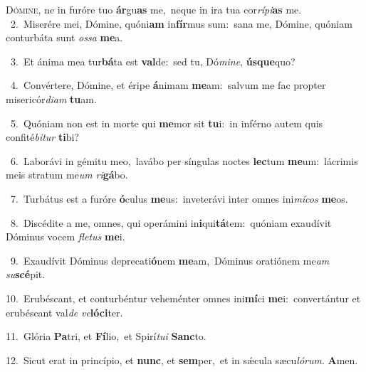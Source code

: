 \lettrine{\initial\textcolor{\initialcolor}{D}}{ómine,} ne in furóre tuo \textbf{ár}\-gu\textbf{as} me,~\star neque in ira tua cor\-\textit{rí}\-\textit{pi}\textbf{as} me.\\
{\numbfont\textcolor{\numbcolor}{~2.}}~Miserére mei, Dómine, quóni\textbf{am} in\-\textbf{fír}\-mus sum:~\star sana me, Dómine, quóniam conturbáta sunt \textit{os}\-\textit{sa} \textbf{me}\-a.\par
{\numbfont\textcolor{\numbcolor}{~3.}}~Et ánima mea tur\-\textbf{bá}\-ta est \textbf{val}\-de:~\star sed tu, Dó\-\textit{mi}\-\textit{ne}, \textbf{ús}\-\textbf{que}quo?\par
{\numbfont\textcolor{\numbcolor}{~4.}}~Convértere, Dómine, et éripe \textbf{á}\-nimam \textbf{me}\-am:~\star salvum me fac propter misericór\-\textit{di}\-\textit{am} \textbf{tu}\-am.\par
{\numbfont\textcolor{\numbcolor}{~5.}}~Quóniam non est in morte qui \textbf{me}\-mor sit \textbf{tu}\-i:~\star in inférno autem quis confité\-\textit{bi}\-\textit{tur} \textbf{ti}\-bi?\par
{\numbfont\textcolor{\numbcolor}{~6.}}~Laborávi in gémitu meo,~\dagger lavábo per síngulas noctes \textbf{lec}\-tum \textbf{me}\-um:~\star lácrimis meis stratum me\textit{um} \textit{ri}\-\textbf{gá}bo.\par
{\numbfont\textcolor{\numbcolor}{~7.}}~Turbátus est a furóre \textbf{ó}\-culus \textbf{me}\-us:~\star inveterávi inter omnes ini\-\textit{mí}\-\textit{cos} \textbf{me}\-os.\par
{\numbfont\textcolor{\numbcolor}{~8.}}~Discédite a me, omnes, qui operámini in\-\textbf{i}\-qui\-\textbf{tá}\-tem:~\star quóniam exaudívit Dóminus vocem \textit{fle}\-\textit{tus} \textbf{me}\-i.\par
{\numbfont\textcolor{\numbcolor}{~9.}}~Exaudívit Dóminus deprecati\-\textbf{ó}\-nem \textbf{me}\-am,~\star Dóminus oratiónem me\textit{am} \textit{su}\-\textbf{scé}pit.\par
{\numbfont\textcolor{\numbcolor}{10.}}~Erubéscant, et conturbéntur veheménter omnes ini\-\textbf{mí}\-ci \textbf{me}\-i:~\star convertántur et erubéscant val\textit{de} \textit{ve}\-\textbf{ló}\textbf{ci}ter.\par
{\numbfont\textcolor{\numbcolor}{11.}}~Glória \textbf{Pa}\-tri, et \textbf{Fí}\-lio,~\star et Spirí\-\textit{tu}\-\textit{i} \textbf{Sanc}\-to.\par
{\numbfont\textcolor{\numbcolor}{12.}}~Sicut erat in princípio, et \textbf{nunc}\-, et \textbf{sem}\-per,~\star et in sǽcula sæcu\-\textit{ló}\-\textit{rum}. \textbf{A}\-men.\par
